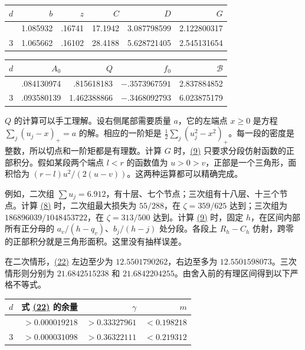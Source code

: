 \documentclass[11pt,a4paper]{article}
\newcounter{none}
\begin{document}
{\def\LTcaptype{none} %
{\small
\begin{longtable}[]{@{}crrrrr@{}}
\toprule\noalign{}
\(d\) & \(b\) & \(z\) & \(C\) & \(D\) & \(G\) \\
\midrule\noalign{}
\endhead
\bottomrule\noalign{}
\endlastfoot
2 & 1.085932 & .16741 & 17.1942 & 3.087798599 & 2.122800317 \\
3 & 1.065662 & .16102 & 28.4188 & 5.628721405 & 2.545131654 \\
\end{longtable}
}
}

{\def\LTcaptype{none} %
{\small
\begin{longtable}[]{@{}crrrr@{}}
\toprule\noalign{}
\(d\) & \(A_0\) & \(Q\) & \(f_0\) & \(\mathcal B\) \\
\midrule\noalign{}
\endhead
\bottomrule\noalign{}
\endlastfoot
2 & .084130974 & .815618183 & \(-.3573967591\) & 2.837884852 \\
3 & .093580139 & 1.462388866 & \(-.3468092793\) & 6.023875179 \\
\end{longtable}
}
}

\(Q\) 的计算可以手工理解。设右侧尾部需要质量 \(a\)，它的左端点 \(x\ge0\) 是方程 \(\sum_j(u_j-x)_+=a\) 的解。相应的一阶矩是 \(\frac12\sum_j(u_j^2-x^2)_+\)。每一段的密度是整数，所以切点和一阶矩都是有理数。计算 \(G\) 时，\hyperref[eq:9]{(9)} 只要求分段仿射函数的正部积分。假如某段两个端点 \(l<r\) 的函数值为 \(u>0>v\)，正部是一个三角形，面积恰为 \((r-l)u^2/(2(u-v))\)。这两种运算都可以精确完成。

例如，二次组 \(\sum u_j=6.912\)，有十层、七个节点；三次组有十八层、十三个节点。计算 \hyperref[eq:8]{(8)} 时，二次组最大损失为 \(55/288\)，在 \(\zeta=359/625\) 达到；三次组为 \(186896039/1048453722\)，在 \(\zeta=313/500\) 达到。计算 \hyperref[eq:9]{(9)} 时，固定 \(h\)，在区间内部所有正分母的 \(a_v/(h-q_v)\)、\(b_j/(h-j)\) 处分段。各段上 \(R_h-C_h\) 仿射，跨零的正部积分就是三角形面积。这里没有抽样误差。

在二次情形，\hyperref[eq:22]{(22)} 左边至少为 \(12.5501790262\)，右边至多为 \(12.5501598073\)。三次情形则分别为 \(21.6842515238\) 和 \(21.6842204255\)。由舍入前的有理区间得到以下严格不等式。

{\def\LTcaptype{none} %
{\small
\begin{longtable}[]{@{}crrr@{}}
\toprule\noalign{}
\(d\) & 式 \hyperref[eq:22]{(22)} 的余量 & \(\gamma\) & \(m\) \\
\midrule\noalign{}
\endhead
\bottomrule\noalign{}
\endlastfoot
2 & \(>0.000019218\) & \(>0.33327961\) & \(<0.198218\) \\
3 & \(>0.000031098\) & \(>0.36322111\) & \(<0.219312\) \\
\end{longtable}
}
}
\end{document}
